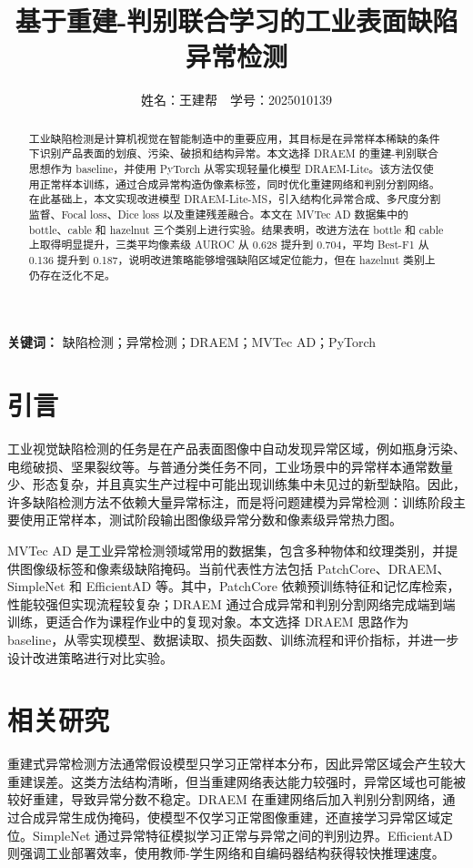 \documentclass[UTF8,a4paper,twocolumn]{ctexart}
\title{基于重建-判别联合学习的工业表面缺陷异常检测}
\author{姓名：王建帮~~学号：2025010139}
\date{}
\begin{document}
\maketitle

\begin{abstract}
工业缺陷检测是计算机视觉在智能制造中的重要应用，其目标是在异常样本稀缺的条件下识别产品表面的划痕、污染、破损和结构异常。本文选择 DRAEM 的重建-判别联合思想作为 baseline，并使用 PyTorch 从零实现轻量化模型 DRAEM-Lite。该方法仅使用正常样本训练，通过合成异常构造伪像素标签，同时优化重建网络和判别分割网络。在此基础上，本文实现改进模型 DRAEM-Lite-MS，引入结构化异常合成、多尺度分割监督、Focal loss、Dice loss 以及重建残差融合。本文在 MVTec AD 数据集中的 bottle、cable 和 hazelnut 三个类别上进行实验。结果表明，改进方法在 bottle 和 cable 上取得明显提升，三类平均像素级 AUROC 从 0.628 提升到 0.704，平均 Best-F1 从 0.136 提升到 0.187，说明改进策略能够增强缺陷区域定位能力，但在 hazelnut 类别上仍存在泛化不足。
\end{abstract}

\noindent\textbf{关键词：} 缺陷检测；异常检测；DRAEM；MVTec AD；PyTorch

\section{引言}
工业视觉缺陷检测的任务是在产品表面图像中自动发现异常区域，例如瓶身污染、电缆破损、坚果裂纹等。与普通分类任务不同，工业场景中的异常样本通常数量少、形态复杂，并且真实生产过程中可能出现训练集中未见过的新型缺陷。因此，许多缺陷检测方法不依赖大量异常标注，而是将问题建模为异常检测：训练阶段主要使用正常样本，测试阶段输出图像级异常分数和像素级异常热力图。

MVTec AD 是工业异常检测领域常用的数据集，包含多种物体和纹理类别，并提供图像级标签和像素级缺陷掩码。当前代表性方法包括 PatchCore、DRAEM、SimpleNet 和 EfficientAD 等。其中，PatchCore 依赖预训练特征和记忆库检索，性能较强但实现流程较复杂；DRAEM 通过合成异常和判别分割网络完成端到端训练，更适合作为课程作业中的复现对象。本文选择 DRAEM 思路作为 baseline，从零实现模型、数据读取、损失函数、训练流程和评价指标，并进一步设计改进策略进行对比实验。

\section{相关研究}
重建式异常检测方法通常假设模型只学习正常样本分布，因此异常区域会产生较大重建误差。这类方法结构清晰，但当重建网络表达能力较强时，异常区域也可能被较好重建，导致异常分数不稳定。DRAEM 在重建网络后加入判别分割网络，通过合成异常生成伪掩码，使模型不仅学习正常图像重建，还直接学习异常区域定位。SimpleNet 通过异常特征模拟学习正常与异常之间的判别边界。EfficientAD 则强调工业部署效率，使用教师-学生网络和自编码器结构获得较快推理速度。
\end{document}

